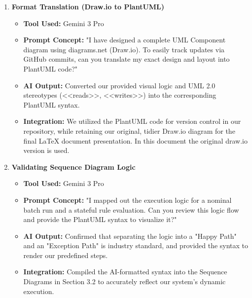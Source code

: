 \documentclass[11pt, a4paper]{article}
\begin{document}
\begin{enumerate}[label=\textbf{Topic \arabic*:}, align=left, leftmargin=0.5cm]
    \item \textbf{Format Translation (Draw.io to PlantUML)}
    \begin{itemize}[label={}, leftmargin=0.5cm]
        \item \textbf{Tool Used:} Gemini 3 Pro
        \item \textbf{Prompt Concept:} "I have designed a complete UML Component diagram using diagrams.net (Draw.io). To easily track updates via GitHub commits, can you translate my exact design and layout into PlantUML code?"
        \item \textbf{AI Output:} Converted our provided visual logic and UML 2.0 stereotypes (<<reads>>, <<writes>>) into the corresponding PlantUML syntax.
        \item \textbf{Integration:} We utilized the PlantUML code for version control in our repository, while retaining our original, tidier Draw.io diagram for the final LaTeX document presentation. In this document the original draw.io version is used.
    \end{itemize}
    \vspace{0.3cm}

    \item \textbf{Validating Sequence Diagram Logic}
    \begin{itemize}[label={}, leftmargin=0.5cm]
        \item \textbf{Tool Used:} Gemini 3 Pro
        \item \textbf{Prompt Concept:} "I mapped out the execution logic for a nominal batch run and a stateful rule evaluation. Can you review this logic flow and provide the PlantUML syntax to visualize it?"
        \item \textbf{AI Output:} Confirmed that separating the logic into a "Happy Path" and an "Exception Path" is industry standard, and provided the syntax to render our predefined steps.
        \item \textbf{Integration:} Compiled the AI-formatted syntax into the Sequence Diagrams in Section 3.2 to accurately reflect our system's dynamic execution.
    \end{itemize}
    \vspace{0.3cm}


\end{enumerate}
\end{document}
